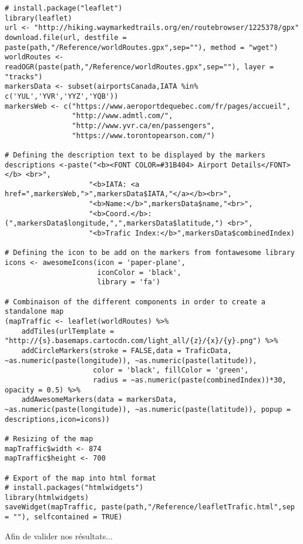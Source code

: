 
\begin{lstlisting}[caption = Générer une carte du trafic aérien avec \emph{leaflet},label=src:leaflet]
# install.package("leaflet")
library(leaflet)
url <- "http://hiking.waymarkedtrails.org/en/routebrowser/1225378/gpx"
download.file(url, destfile = paste(path,"/Reference/worldRoutes.gpx",sep=""), method = "wget")
worldRoutes <- readOGR(paste(path,"/Reference/worldRoutes.gpx",sep=""), layer = "tracks")
markersData <- subset(airportsCanada,IATA %in% c('YUL','YVR','YYZ','YQB'))
markersWeb <- c("https://www.aeroportdequebec.com/fr/pages/accueil",
                "http://www.admtl.com/",
                "http://www.yvr.ca/en/passengers",
                "https://www.torontopearson.com/")

# Defining the description text to be displayed by the markers
descriptions <-paste("<b><FONT COLOR=#31B404> Airport Details</FONT></b> <br>",
                    "<b>IATA: <a href=",markersWeb,">",markersData$IATA,"</a></b><br>",
                    "<b>Name:</b>",markersData$name,"<br>",
                    "<b>Coord.</b>: (",markersData$longitude,",",markersData$latitude,") <br>",
                    "<b>Trafic Index:</b>",markersData$combinedIndex)

# Defining the icon to be add on the markers from fontawesome library
icons <- awesomeIcons(icon = 'paper-plane',
                      iconColor = 'black',
                      library = 'fa')

# Combinaison of the different components in order to create a standalone map
(mapTraffic <- leaflet(worldRoutes) %>%
    addTiles(urlTemplate = "http://{s}.basemaps.cartocdn.com/light_all/{z}/{x}/{y}.png") %>%
    addCircleMarkers(stroke = FALSE,data = TraficData, ~as.numeric(paste(longitude)), ~as.numeric(paste(latitude)),
                     color = 'black', fillColor = 'green',
                     radius = ~as.numeric(paste(combinedIndex))*30, opacity = 0.5) %>%
    addAwesomeMarkers(data = markersData, ~as.numeric(paste(longitude)), ~as.numeric(paste(latitude)), popup = descriptions,icon=icons))

# Resizing of the map
mapTraffic$width <- 874
mapTraffic$height <- 700

# Export of the map into html format
# install.packages("htmlwidgets")
library(htmlwidgets)
saveWidget(mapTraffic, paste(path,"/Reference/leafletTrafic.html",sep = ""), selfcontained = TRUE)
\end{lstlisting}




Afin de valider nos résultats...

